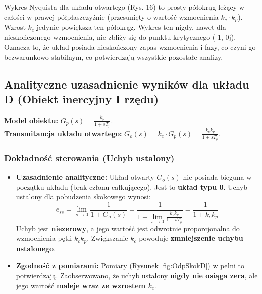 \documentclass[12pt,a4paper]{article}
\begin{document}
	Wykres Nyquista dla układu otwartego (Rys. 16) to prosty półokrąg leżący w całości w prawej półpłaszczyźnie (przesunięty o wartość wzmocnienia $k_c \cdot k_p$). Wzrost $k_c$ jedynie powiększa ten półokrąg. Wykres ten nigdy, nawet dla nieskończonego wzmocnienia, nie zbliży się do punktu krytycznego (-1, 0j). Oznacza to, że układ posiada nieskończony zapas wzmocnienia i fazy, co czyni go bezwarunkowo stabilnym, co potwierdzają wszystkie pozostałe analizy.
	
	\subsection{Analityczne uzasadnienie wyników dla układu D (Obiekt inercyjny I rzędu)}
	
	\textbf{Model obiektu:} $G_p(s) = \frac{k_p}{1 + sT_p}$. \\
	\textbf{Transmitancja układu otwartego:} $G_o(s) = k_c \cdot G_p(s) = \frac{k_c k_p}{1 + sT_p}$.
	
	\subsubsection{Dokładność sterowania (Uchyb ustalony)}
	\begin{itemize}
		\item \textbf{Uzasadnienie analityczne:} Układ otwarty $G_o(s)$ nie posiada bieguna w początku układu (brak członu całkującego). Jest to \textbf{układ typu 0}. Uchyb ustalony dla pobudzenia skokowego wynosi:
		\[
		e_{ss} = \lim_{s \to 0} \frac{1}{1 + G_o(s)} = \frac{1}{1 + \lim_{s \to 0} \frac{k_c k_p}{1 + sT_p}} = \frac{1}{1 + k_c k_p}
		\]
		Uchyb jest \textbf{niezerowy}, a jego wartość jest odwrotnie proporcjonalna do wzmocnienia pętli $k_c k_p$. Zwiększanie $k_c$ powoduje \textbf{zmniejszenie uchybu ustalonego}.
		
		\item \textbf{Zgodność z pomiarami:} Pomiary (Rysunek \ref{fig:OdpSkokD}) w pełni to potwierdzają. Zaobserwowano, że uchyb ustalony \textbf{nigdy nie osiąga zera}, ale jego wartość \textbf{maleje wraz ze wzrostem $k_c$}.
	\end{itemize}
	
\end{document}

